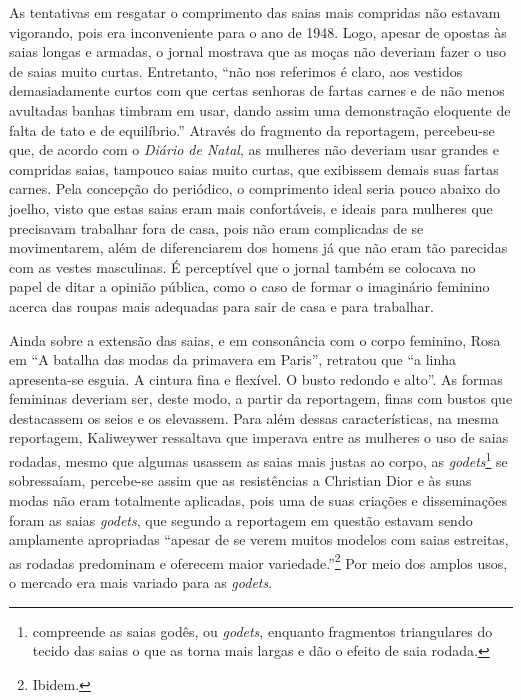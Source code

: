 \begin{refsection}
    As tentativas em resgatar o comprimento das saias mais compridas não estavam vigorando, pois era inconveniente para o ano de 1948. Logo, apesar de opostas às saias longas e armadas, o jornal mostrava que as moças não deveriam fazer o uso de saias muito curtas. Entretanto, ``não nos referimos é claro, aos vestidos demasiadamente curtos com que certas senhoras de fartas carnes e de não menos avultadas banhas timbram em usar, dando assim uma demonstração eloquente de falta de tato e de equilíbrio.'' Através do fragmento da reportagem, percebeu-se que, de acordo com o \textit{Diário de Natal}, as mulheres não deveriam usar grandes e compridas saias, tampouco saias muito curtas, que exibissem demais suas fartas carnes. Pela concepção do periódico, o comprimento ideal seria pouco abaixo do joelho, visto que estas saias eram mais confortáveis, e ideais para mulheres que precisavam trabalhar fora de casa, pois não eram complicadas de se movimentarem, além de diferenciarem dos homens já que não eram tão parecidas com as vestes masculinas. É perceptível que o jornal também se colocava no papel de ditar a opinião pública, como o caso de formar o imaginário feminino acerca das roupas mais adequadas para sair de casa e para trabalhar. 

    Ainda sobre a extensão das saias, e em consonância com o corpo feminino, Rosa \textcite{Kaliweyer1948Batalha} em ``A batalha das modas da primavera em Paris'', retratou que ``a linha apresenta-se esguia. A cintura fina e flexível. O busto redondo e alto''. As formas femininas deveriam ser, deste modo, a partir da reportagem, finas com bustos que destacassem os seios e os elevassem. Para além dessas características, na mesma reportagem, Kaliweywer ressaltava que imperava entre as mulheres o uso de saias rodadas, mesmo que algumas usassem as saias mais justas ao corpo, as \textit{godets}\footnote{\textcite{MedeirosFl2014Arremedando} compreende as saias godês, ou \textit{godets}, enquanto fragmentos triangulares do tecido das saias o que as torna mais largas e dão o efeito de saia rodada.} se sobressaíam, percebe-se assim que as resistências a Christian Dior e às suas modas não eram totalmente aplicadas, pois uma de suas criações e disseminações foram as saias \textit{godets}, que segundo a reportagem em questão estavam sendo amplamente apropriadas ``apesar de se verem muitos modelos com saias estreitas, as rodadas predominam e oferecem maior variedade.''\footnote{Ibidem.} Por meio dos amplos usos, o mercado era mais variado para as \textit{godets}.


\end{refsection}
